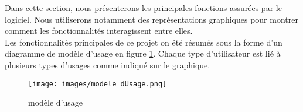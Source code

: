 Dans cette section, nous présenterons les principales fonctions assurées par le logiciel. Nous utiliserons notamment des représentations graphiques pour montrer comment les fonctionnalités interagissent entre elles.\\




Les fonctionnalités principales de ce projet on été résumés sous la forme d'un diagramme de modèle d'usage en figure \ref{mod_use}. Chaque type d'utilisateur est lié à plusieurs types d'usages comme indiqué sur le graphique.

\begin{figure}
	\centering
	\texttt{[image: images/modele\_dUsage.png]}
	\caption{\label{mod_use} modèle d'usage}
\end{figure}
